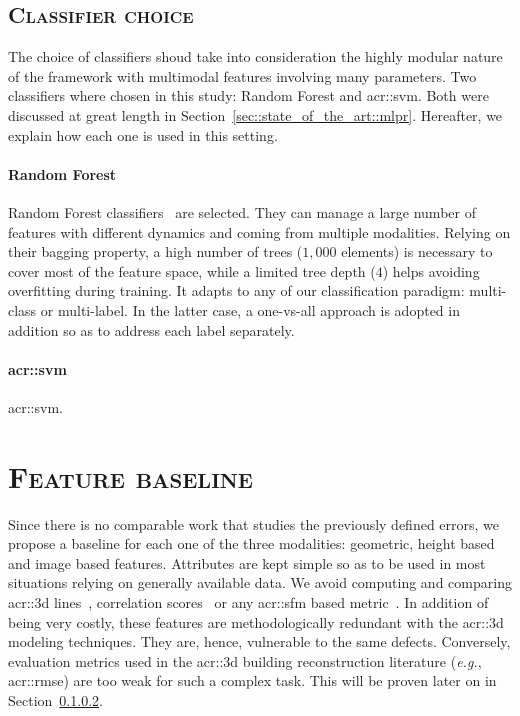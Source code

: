     \subsection{\textsc{Classifier choice}}
        \label{subsec::learned_evaluation::classification::classifiers}
        The choice of classifiers shoud take into consideration the highly modular nature of the framework with multimodal features involving many parameters.
        Two classifiers where chosen in this study: Random Forest and \gls{acr::svm}.
        Both were discussed at great length in Section~\ref{sec::state_of_the_art::mlpr}.
        Hereafter, we explain how each one is used in this setting.\\

        \paragraph{Random Forest}
            Random Forest classifiers~\parencite{breiman2001random,criminisi2013decision} are selected.
            They can manage a large number of features with different dynamics and coming from multiple modalities.
            Relying on their bagging property, a high number of trees ($1,000$ elements) is necessary to cover most of the feature space, while a limited tree depth ($4$) helps avoiding overfitting during training.
            It adapts to any of our classification paradigm: multi-class or multi-label.
            In the latter case, a one-vs-all approach is adopted in addition so as to address each label separately.

        \paragraph{\acrshort*{acr::svm}}
            \gls{acr::svm}.

\section{\textsc{Feature baseline}}
    \label{sec::learned_evaluation::baseline}
    Since there is no comparable work that studies the previously defined errors, we propose a baseline for each one of the three modalities: geometric, height based and image based features.
    Attributes are kept simple so as to be used in most situations relying on generally available data.
    We avoid computing and comparing \gls{acr::3d} lines~\parencite{michelin2013quality}, correlation scores~\parencite{boudet2006supervised} or any \gls{acr::sfm} based metric~\parencite{kowdle2011active}.
    In addition of being very costly, these features are methodologically redundant with the \gls{acr::3d} modeling techniques.
    They are, hence, vulnerable to the same defects.
    Conversely, evaluation metrics used in the \gls{acr::3d} building reconstruction literature (\textit{e.g.}, \gls{acr::rmse}) are too weak for such a complex task.
    This will be proven later on in Section~\ref{}.


